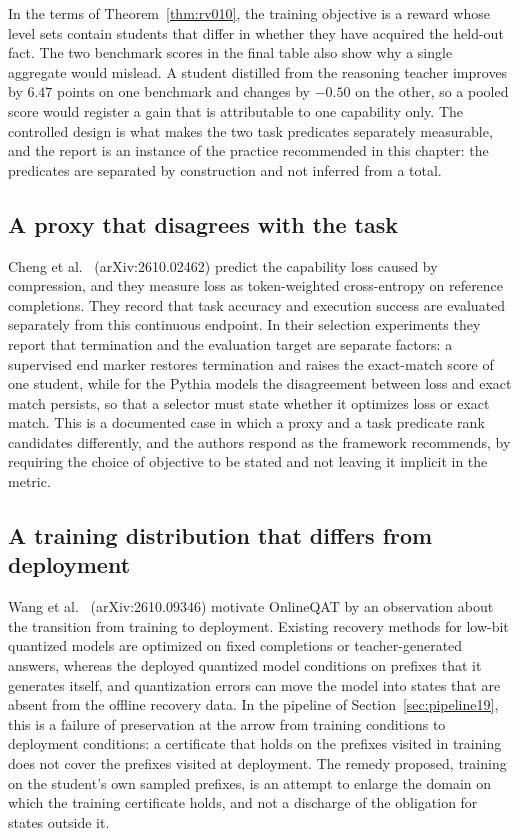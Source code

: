 In the terms of Theorem~\ref{thm:rv010}, the training objective is a reward whose level sets contain students that differ in whether they have acquired the held-out fact. The two benchmark scores in the final table also show why a single aggregate would mislead. A student distilled from the reasoning teacher improves by $6.47$ points on one benchmark and changes by $-0.50$ on the other, so a pooled score would register a gain that is attributable to one capability only. The controlled design is what makes the two task predicates separately measurable, and the report is an instance of the practice recommended in this chapter: the predicates are separated by construction and not inferred from a total.

\subsection*{A proxy that disagrees with the task}

Cheng et al.\ \cite{Cheng26} (arXiv:2610.02462) predict the capability loss caused by compression, and they measure loss as token-weighted cross-entropy on reference completions. They record that task accuracy and execution success are evaluated separately from this continuous endpoint. In their selection experiments they report that termination and the evaluation target are separate factors: a supervised end marker restores termination and raises the exact-match score of one student, while for the Pythia models the disagreement between loss and exact match persists, so that a selector must state whether it optimizes loss or exact match. This is a documented case in which a proxy and a task predicate rank candidates differently, and the authors respond as the framework recommends, by requiring the choice of objective to be stated and not leaving it implicit in the metric.

\subsection*{A training distribution that differs from deployment}

Wang et al.\ \cite{Wang26} (arXiv:2610.09346) motivate OnlineQAT by an observation about the transition from training to deployment. Existing recovery methods for low-bit quantized models are optimized on fixed completions or teacher-generated answers, whereas the deployed quantized model conditions on prefixes that it generates itself, and quantization errors can move the model into states that are absent from the offline recovery data. In the pipeline of Section~\ref{sec:pipeline19}, this is a failure of preservation at the arrow from training conditions to deployment conditions: a certificate that holds on the prefixes visited in training does not cover the prefixes visited at deployment. The remedy proposed, training on the student's own sampled prefixes, is an attempt to enlarge the domain on which the training certificate holds, and not a discharge of the obligation for states outside it.

